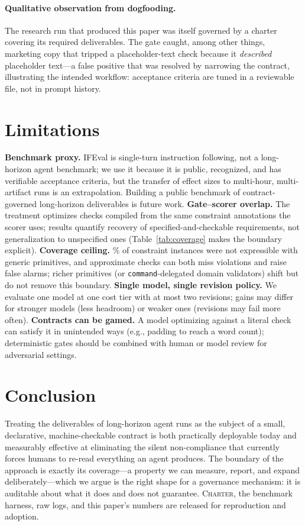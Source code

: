 \documentclass{article}
\begin{document}
\paragraph{Qualitative observation from dogfooding.} The research run that
produced this paper was itself governed by a charter covering its required
deliverables. The gate caught, among other things, marketing copy that tripped a
placeholder-text check because it \emph{described} placeholder text---a
false positive that was resolved by narrowing the contract, illustrating the
intended workflow: acceptance criteria are tuned in a reviewable file, not in
prompt history.

\section{Limitations}
\label{sec:limitations}

\textbf{Benchmark proxy.} IFEval is single-turn instruction following, not a
long-horizon agent benchmark; we use it because it is public, recognized, and has
verifiable acceptance criteria, but the transfer of effect sizes to multi-hour,
multi-artifact runs is an extrapolation. Building a public benchmark of
contract-governed long-horizon deliverables is future work. \textbf{Gate--scorer
overlap.} The treatment optimizes checks compiled from the same constraint
annotations the scorer uses; results quantify recovery of specified-and-checkable
requirements, not generalization to unspecified ones (Table~\ref{tab:coverage}
makes the boundary explicit). \textbf{Coverage ceiling.} \UncoveredPct\% of
constraint instances were not expressible with generic primitives, and
approximate checks can both miss violations and raise false alarms; richer
primitives (or \texttt{command}-delegated domain validators) shift but do not
remove this boundary. \textbf{Single model, single revision policy.} We evaluate
one model at one cost tier with at most two revisions; gains may differ for
stronger models (less headroom) or weaker ones (revisions may fail more often).
\textbf{Contracts can be gamed.} A model optimizing against a literal check can
satisfy it in unintended ways (e.g., padding to reach a word count); deterministic
gates should be combined with human or model review for adversarial settings.

\section{Conclusion}

Treating the deliverables of long-horizon agent runs as the subject of a small,
declarative, machine-checkable contract is both practically deployable today and
measurably effective at eliminating the silent non-compliance that currently
forces humans to re-read everything an agent produces. The boundary of the
approach is exactly its coverage---a property we can measure, report, and expand
deliberately---which we argue is the right shape for a governance mechanism: it
is auditable about what it does and does not guarantee. \textsc{Charter}, the
benchmark harness, raw logs, and this paper's numbers are released for
reproduction and adoption.
\end{document}
